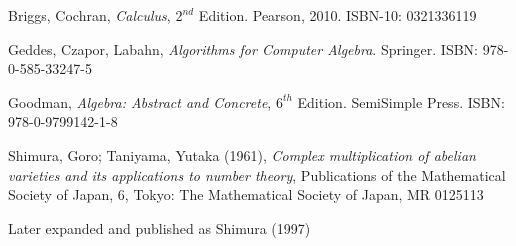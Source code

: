 

\begin{thebibliography}{9}

Briggs, Cochran, {\it Calculus}, $2^{nd}$ Edition.  Pearson, 2010.  ISBN-10: 0321336119

Geddes, Czapor, Labahn, {\it Algorithms for Computer Algebra}. Springer.
ISBN: 978-0-585-33247-5

Goodman, {\it Algebra: Abstract and Concrete}, $6^{th}$ Edition.  SemiSimple Press.
ISBN: 978-0-9799142-1-8

Shimura, Goro; Taniyama, Yutaka (1961), {\it Complex multiplication of abelian varieties and its applications to number theory},
Publications of the Mathematical Society of Japan, 6, Tokyo: The Mathematical Society of Japan, MR 0125113

Later expanded and published as Shimura (1997)

\end{thebibliography}
